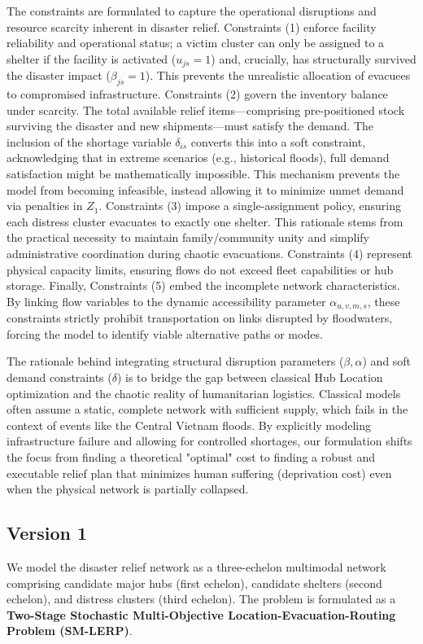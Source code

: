The constraints are formulated to capture the operational disruptions and resource scarcity inherent in disaster relief.
Constraints (1) enforce facility reliability and operational status; a victim cluster can only be assigned to a shelter if the facility is activated ($u_{js}=1$) and, crucially, has structurally survived the disaster impact ($ \beta_{js}=1$). This prevents the unrealistic allocation of evacuees to compromised infrastructure.
Constraints (2) govern the inventory balance under scarcity. The total available relief items—comprising pre-positioned stock surviving the disaster and new shipments—must satisfy the demand. The inclusion of the shortage variable $\delta_{is}$ converts this into a soft constraint, acknowledging that in extreme scenarios (e.g., historical floods), full demand satisfaction might be mathematically impossible. This mechanism prevents the model from becoming infeasible, instead allowing it to minimize unmet demand via penalties in $Z_1$.
Constraints (3) impose a single-assignment policy, ensuring each distress cluster evacuates to exactly one shelter. This rationale stems from the practical necessity to maintain family/community unity and simplify administrative coordination during chaotic evacuations.
Constraints (4) represent physical capacity limits, ensuring flows do not exceed fleet capabilities or hub storage.
Finally, Constraints (5) embed the incomplete network characteristics. By linking flow variables to the dynamic accessibility parameter $\alpha_{u,v,m,s}$, these constraints strictly prohibit transportation on links disrupted by floodwaters, forcing the model to identify viable alternative paths or modes.

The rationale behind integrating structural disruption parameters ($\beta, \alpha$) and soft demand constraints ($\delta$) is to bridge the gap between classical Hub Location optimization and the chaotic reality of humanitarian logistics. Classical models often assume a static, complete network with sufficient supply, which fails in the context of events like the Central Vietnam floods. By explicitly modeling infrastructure failure and allowing for controlled shortages, our formulation shifts the focus from finding a theoretical "optimal" cost to finding a robust and executable relief plan that minimizes human suffering (deprivation cost) even when the physical network is partially collapsed.

\subsection{Version 1}
We model the disaster relief network as a three-echelon multimodal network comprising candidate major hubs (first echelon), candidate shelters (second echelon), and distress clusters (third echelon). The problem is formulated as a \textbf{Two-Stage Stochastic Multi-Objective Location-Evacuation-Routing Problem (SM-LERP)}. 

